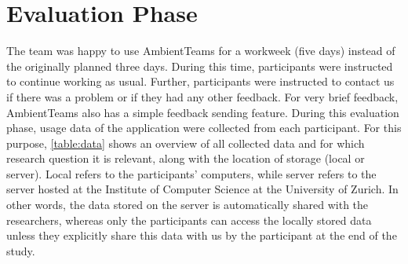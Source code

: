 \section{Evaluation Phase}
\label{section:evaluation}
The team was happy to use AmbientTeams for a workweek (five days) instead of the originally planned three days. During this time, participants were instructed to continue working as usual. Further, participants were instructed to contact us if there was a problem or if they had any other feedback. For very brief feedback, AmbientTeams also has a simple feedback sending feature. During this evaluation phase, usage data of the application were collected from each participant. For this purpose, \autoref{table:data} shows an overview of all collected data and for which research question it is relevant, along with the location of storage (local or server). Local refers to the participants' computers, while server refers to the server hosted at the Institute of Computer Science at the University of Zurich. In other words, the data stored on the server is automatically shared with the researchers, whereas only the participants can access the locally stored data unless they explicitly share this data with us by the participant at the end of the study.


